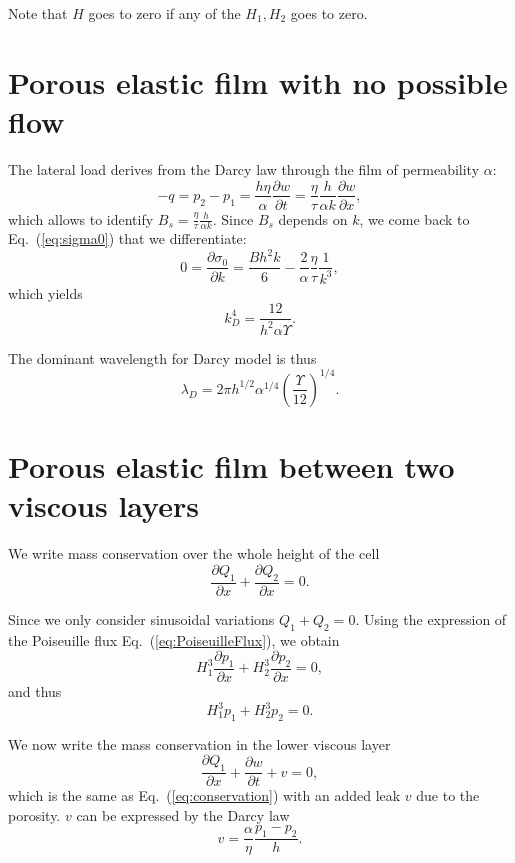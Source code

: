 \documentclass[12pt,a4paper]{revtex4}
\begin{document}
Note that $H$ goes to zero if any of the $H_1,H_2$ goes to zero.

\section{Porous elastic film with no possible flow}
The lateral load derives from the Darcy law through the film of permeability $\alpha$:
\begin{equation}
-q = p_2-p_1 = \frac{h\eta}{\alpha}\frac{\partial w}{\partial t} = \frac{\eta}{\tau}\frac{h}{\alpha k} \frac{\partial w}{\partial x},
\end{equation}
which allows to identify $B_s = \frac{\eta}{\tau}\frac{h}{\alpha k}$. Since $B_s$ depends on $k$, we come back to Eq.~(\ref{eq:sigma0}) that we differentiate:
\begin{equation}
0 = \frac{\partial\sigma_0}{\partial k}
 = \frac{Bh^2 k}{6} - \frac{2}{\alpha}\frac{\eta}{\tau}\frac{1}{k^3},
\end{equation}
which yields 
\begin{equation}
k_D^4 = \frac{12}{h^2\alpha\Upsilon}.
\end{equation}

The dominant wavelength for Darcy model is thus
\begin{equation}
\lambda_D = 2\pi h^{1/2}\alpha^{1/4}\left(\frac{\Upsilon}{12}\right)^{1/4}.
\end{equation}

\section{Porous elastic film between two viscous layers}
We write mass conservation over the whole height of the cell
\begin{equation}
\frac{\partial Q_1}{\partial x} + \frac{\partial Q_2}{\partial x} = 0.
\end{equation}

Since we only consider sinusoidal variations $Q_1 + Q_2 = 0$. Using the expression of the Poiseuille flux Eq.~(\ref{eq:PoiseuilleFlux}), we obtain
\begin{equation}
H_1^3 \frac{\partial p_1}{\partial x} + H_2^3 \frac{\partial p_2}{\partial x} = 0,
\end{equation}
and thus
\begin{equation}
H_1^3 p_1 + H_2^3 p_2 = 0.
\label{eq:pressures}
\end{equation}

We now write the mass conservation in the lower viscous layer
\begin{equation}
\frac{\partial Q_1}{\partial x} + \frac{\partial w}{\partial t} + v = 0,
\label{eq:conservationDarcy}
\end{equation}
which is the same as Eq.~(\ref{eq:conservation}) with an added leak $v$ due to the porosity. $v$ can be expressed by the Darcy law
\begin{equation}
v = \frac{\alpha}{\eta} \frac{p_1-p_2}{h}.
\label{eq:Darcy}
\end{equation}
\end{document}
